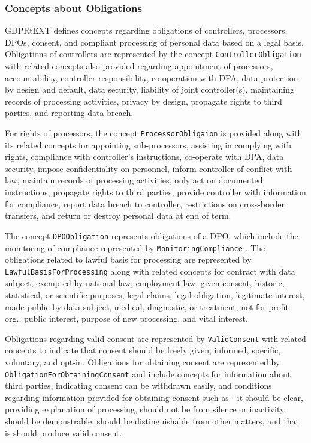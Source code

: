 \subsubsection{Concepts about Obligations}
GDPRtEXT defines concepts regarding obligations of controllers, processors, DPOs, consent, and compliant processing of personal data based on a legal basis. Obligations of controllers are represented by the concept \texttt{ControllerObligation} with related concepts also provided regarding  appointment of processors, accountability, controller responsibility, co-operation with DPA, data protection by design and default, data security, liability of joint controller(s), maintaining records of processing activities, privacy by design, propagate rights to third parties, and reporting data breach.

For rights of processors, the concept \texttt{ProcessorObligaion} is provided along with its related concepts for appointing sub-processors, assisting in complying with rights, compliance with controller's instructions, co-operate with DPA, data security, impose confidentiality on personnel, inform controller of conflict with law, maintain records of processing activities, only act on documented instructions, propagate rights to third parties, provide controller with information for compliance, report data breach to controller, restrictions on cross-border transfers, and return or destroy personal data at end of term.

The concept \texttt{DPOObligation} represents obligations of a DPO, which include the monitoring of compliance represented by \texttt{MonitoringCompliance} . The obligations related to lawful basis for processing are represented by \texttt{LawfulBasisForProcessing} along with related concepts for contract with data subject, exempted by national law, employment law, given consent, historic, statistical, or scientific purposes, legal claims, legal obligation, legitimate interest, made public by data subject, medical, diagnostic, or treatment, not for profit org., public interest, purpose of new processing, and vital interest.

Obligations regarding valid consent are represented by \texttt{ValidConsent} with related concepts to indicate that consent should be freely given, informed, specific, voluntary, and opt-in. 
Obligations for obtaining consent are represented by \texttt{ObligationForObtainingConsent} and include concepts for information about third parties, indicating consent can be withdrawn easily, and conditions regarding information provided for obtaining consent such as - it should be clear, providing explanation of processing, should not be from silence or inactivity, should be demonstrable, should be distinguishable from other matters, and that is should produce valid consent.

